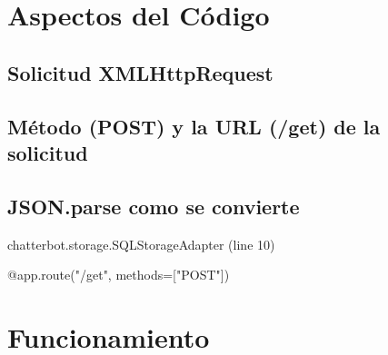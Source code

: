 \documentclass[a4paper,12pt]{article}
\begin{document}
\section{Aspectos del Código}

\subsection{Solicitud XMLHttpRequest}
\subsection{Método (POST) y la URL (/get) de la solicitud}
\subsection{JSON.parse como se convierte }


chatterbot.storage.SQLStorageAdapter (line 10)


@app.route("/get", methods=["POST"])

\section{Funcionamiento}

\newpage %
\thispagestyle{fancyref}
\printbibliography %
\end{document}
